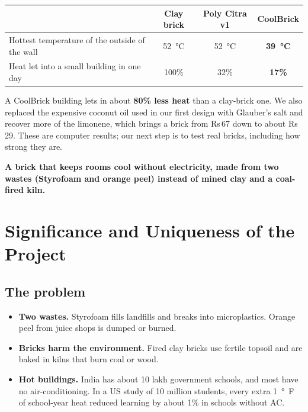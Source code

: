 \documentclass[11pt,a4paper]{article}
\providecommand{\rupee}{Rs}
\let\origsection\section
\renewcommand{\section}{\clearpage\origsection}
\begin{document}
\begin{center}
\begin{tabular}{lccc}
\toprule
 & Clay brick & Poly Citra v1 & \textbf{CoolBrick} \\
\midrule
Hottest temperature of the outside of the wall & \SI{52}{\celsius} & \SI{52}{\celsius} & \textbf{\SI{39}{\celsius}} \\
Heat let into a small building in one day & 100\% & 32\% & \textbf{17\%} \\
\bottomrule
\end{tabular}
\end{center}

A CoolBrick building lets in about \textbf{80\% less heat} than a
clay-brick one. We also replaced the expensive coconut oil used in our first
design with Glauber's salt and recover more of the limonene, which brings a brick from \rupee\,67 down to about \rupee\,29. These
are computer results; our next step is to test real bricks, including how
strong they are.

\begin{usp}
\Large\bfseries A brick that keeps rooms cool without electricity, made from
two wastes (Styrofoam and orange peel) instead of mined clay and a coal-fired kiln.
\end{usp}

\section{Significance and Uniqueness of the Project}

\subsection{The problem}
\begin{itemize}
  \item \textbf{Two wastes.} Styrofoam fills landfills and breaks into
        microplastics. Orange peel from juice shops is dumped or burned.
  \item \textbf{Bricks harm the environment.} Fired clay bricks use fertile
        topsoil and are baked in kilns that burn coal or wood.
  \item \textbf{Hot buildings.} India has about 10 lakh government schools,
        and most have no air-conditioning. In a US study of 10 million
        students, every extra \SI{1}{\degree F} of school-year heat reduced
        learning by about 1\% in schools without AC.
\end{itemize}
\end{document}
